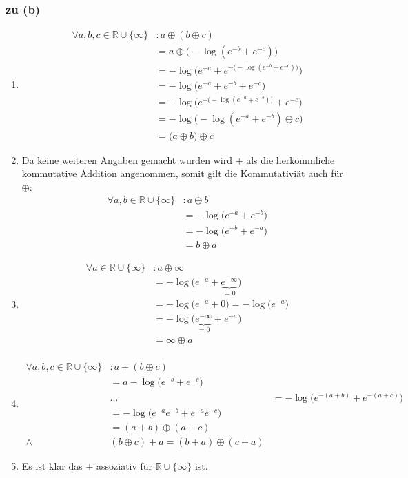 \documentclass{scrartcl}
\begin{document}
\subsubsection{zu (b)}

\renewcommand{\baseset}{\mathbb{R} \cup \{\infty\}}
\begin{enumerate}
    \item \begin{align*}
        \forall a, b, c \in \baseset&: a \oplus (b \oplus c)\\
            &= a \oplus \big(-\log(e^{-b} + e^{-c})\big)\\
            &= -\log\Big(e^{-a} + e^{-\big(-\log(e^{-b} + e^{-c})\big)}\Big)\\
            &= -\log\Big(e^{-a} + e^{-b} + e^{-c}\Big)\\
            &= -\log\Big(e^{-\big(-\log(e^{-a} + e^{-b})\big)} + e^{-c}\Big)\\
            &= -\log\big(-\log(e^{-a} + e^{-b}) \oplus c\big)\\
            &= \big(a \oplus b\big) \oplus c
    \end{align*}
    \item Da keine weiteren Angaben gemacht wurden wird $+$ als die herkömmliche kommutative Addition angenommen, somit gilt die Kommutativiät auch für $\oplus$:
    \begin{align*}
        \forall a, b \in \baseset&: a \oplus b\\
            &= -\log\big(e^{-a} + e^{-b}\big)\\
            &= -\log\big(e^{-b} + e^{-a}\big)\\
            &= b \oplus a
    \end{align*}
    \item \begin{align*}
        \forall a \in \baseset&: a \oplus \infty\\
            &= -\log\big(e^{-a} + \underbrace{e^{-\infty}}_{= 0}\big)\\
            &= -\log\big(e^{-a} + 0\big) = -\log\big(e^{-a}\big)\\
            &= -\log\big(\underbrace{e^{-\infty}}_{= 0} + e^{-a}\big)\\
            &= \infty \oplus a\\
    \end{align*}
    \item \begin{align*}
        \forall a, b, c \in \baseset&: a + (b \oplus c)\\
            &= a -\log\big(e^{-b} + e^{-c}\big)\\
            &\ldots
            &= -\log\Big(e^{-(a+b)} + e^{-(a+c)}\Big)\\
            &= -\log\Big(e^{-a}e^{-b} + e^{-a}e^{-c}\Big)\\
            &= (a + b) \oplus (a + c)\\
            \land\quad& (b \oplus c) + a = (b + a) \oplus (c + a)
    \end{align*}
    \item Es ist klar das $+$ assoziativ für $\baseset$ ist.
\end{enumerate}
\end{document}
